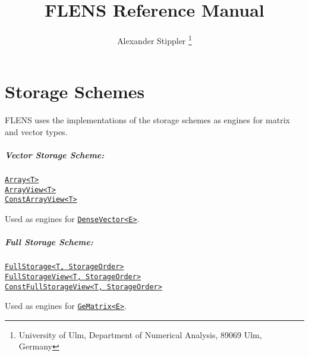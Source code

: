 \documentclass{book}
\title{FLENS Reference Manual}
\author{Alexander Stippler \thanks{University of Ulm, Department of Numerical Analysis, 89069 Ulm, Germany}}
\begin{document}

\maketitle


\setcounter{tocdepth}{2}
\tableofcontents


\chapter{Storage Schemes}

FLENS uses the implementations of the storage schemes as engines for matrix and vector types.
    

\paragraph{Vector Storage Scheme:}
  \begin{description}
  \item[\hyperlink{Array}{{\tt Array<T>}}]
  \item[\hyperlink{ArrayView}{{\tt ArrayView<T>}}]
  \item[\hyperlink{ConstArrayView}{{\tt ConstArrayView<T>}}]
  \end{description}
  Used as engines for \hyperlink{DenseVector}{{\tt DenseVector<E>}}.

\paragraph{Full Storage Scheme:}
  \begin{description}
  \item[\hyperlink{FullStorage}{{\tt FullStorage<T, StorageOrder>}}]
  \item[\hyperlink{FullStorageView}{{\tt FullStorageView<T, StorageOrder>}}]
  \item[\hyperlink{ConstFullStorageView}%
                  {{\tt ConstFullStorageView<T, StorageOrder>}}]
  \end{description}
  Used as engines for \hyperlink{GeMatrix}{{\tt GeMatrix<E>}}.









\printindex
\end{document}
